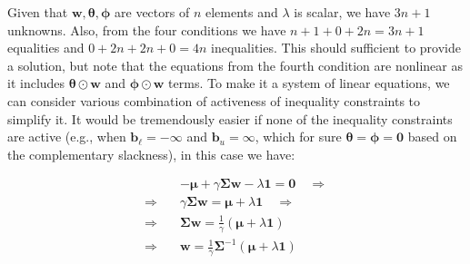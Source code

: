 \documentclass{beamer}
\begin{document}
\begin{frame}

\justifying
Given that $\mathbf{w}, \boldsymbol\theta, \boldsymbol\phi$ are vectors of $n$ elements and $\lambda$ is scalar, we have $3n+1$ unknowns. Also, from the four conditions we have $n+1+0+2n=3n+1$ equalities and $0+2n+2n+0=4n$ inequalities. This should sufficient to provide a solution, but note that the equations from the fourth condition are nonlinear as it includes $\boldsymbol\theta \odot \mathbf{w}$ and $\boldsymbol\phi \odot \mathbf{w}$ terms. To make it a system of linear equations, we can consider various combination of activeness of inequality constraints to simplify it. It would be tremendously easier if none of the inequality constraints are active (e.g., when $\mathbf{b}_{\ell} = -\boldsymbol\infty$ and $\mathbf{b}_{u} = \boldsymbol\infty$, which for sure $\boldsymbol\theta=\boldsymbol\phi=\mathbf{0}$ based on the complementary slackness), in this case we have:

\justifying
\begin{equation*}
\begin{aligned}
	& -\boldsymbol\mu + \gamma\mathbf{\Sigma}\mathbf{w} - \lambda \mathbf{1} = \mathbf{0} \quad \Rightarrow \\
	\Rightarrow \quad & \gamma\mathbf{\Sigma}\mathbf{w} = \boldsymbol\mu + \lambda \mathbf{1} \quad \Rightarrow \\
	\Rightarrow \quad & \mathbf{\Sigma}\mathbf{w} = \frac{1}{\gamma} \left(\boldsymbol\mu + \lambda \mathbf{1}\right) \\
	\Rightarrow \quad & \mathbf{w} = \frac{1}{\gamma} \mathbf{\Sigma}^{-1} \left(\boldsymbol\mu + \lambda \mathbf{1}\right) \\
\end{aligned}
\end{equation*}



\end{frame}
\end{document}
